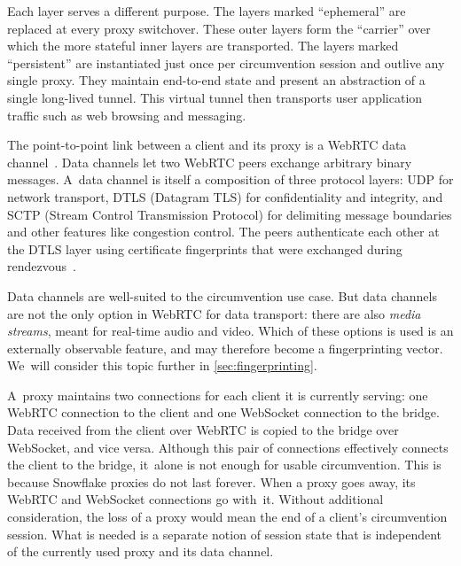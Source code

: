 \documentclass[letterpaper,twocolumn]{article}
\newcommand{\firstterm}[1]{\textit{#1}}
\begin{document}
Each layer serves a different purpose.
The layers marked ``ephemeral'' are replaced
at every proxy switchover.
These outer layers form the ``carrier''
over which the more stateful inner layers are transported.
The layers marked ``persistent'' are instantiated just once
per circumvention session and outlive any single proxy.
They maintain end-to-end state
and present an abstraction of a single long-lived tunnel.
This virtual tunnel then transports user application traffic
such as web browsing and messaging.

The point-to-point link between a client and its proxy is
a WebRTC data channel~\cite{rfc8831}.
Data channels let two WebRTC peers
exchange arbitrary binary messages.
A~data channel is itself a composition of three protocol layers:
UDP for network transport,
DTLS (Datagram TLS)
for confidentiality and integrity, and
SCTP (Stream Control Transmission Protocol)
for delimiting message boundaries
and other features like congestion control.
The peers authenticate each other
at the DTLS layer using certificate fingerprints
that were exchanged during rendezvous~\cite[\S 5.1]{rfc8842}.

Data channels are well-suited to the circumvention use case.
But data channels are not the only option
in WebRTC for data transport:
there are also \firstterm{media streams},
meant for real-time audio and video.
Which of these options is used is an externally observable feature,
and may therefore become a fingerprinting vector.
We~will consider this topic further in \autoref{sec:fingerprinting}.

%

A~proxy maintains two connections for each client it is currently serving:
one WebRTC connection to the client and one WebSocket connection to the bridge.
Data received from the client over WebRTC
is copied to the bridge over WebSocket,
and vice versa.
Although this pair of connections
effectively connects the client to the bridge,
it~alone is not enough for usable circumvention.
This is because Snowflake proxies do not last forever.
When a proxy goes away,
its WebRTC and WebSocket connections go with~it.
Without additional consideration,
the loss of a proxy would mean the end
of a client's circumvention session.
What is needed is a separate notion of session state
that is independent of the currently used proxy
and its data channel.
\end{document}
